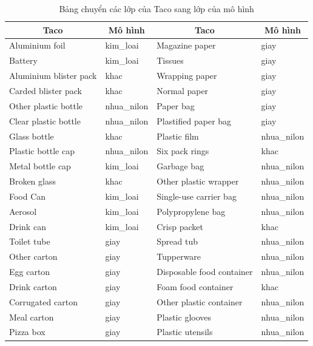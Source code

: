 \documentclass[../the.tex]{subfiles}
\begin{document}
\begin{table}[!ht]
    \centering
    \caption{Bảng chuyển các lớp của Taco sang lớp của mô hình}
    \begin{tabular}{|l|l|l|l|}
		\hline 
		 \multicolumn{1}{|c|}{\textbf{Taco}}
		 & \multicolumn{1}{c|}{\textbf{Mô hình}}
		 & \multicolumn{1}{c|}{\textbf{Taco}}
		 & \multicolumn{1}{c|}{\textbf{Mô hình}}  \\
		\hline
        Aluminium foil & kim\_loai & Magazine paper & giay \\ \hline
        Battery & kim\_loai & Tissues & giay \\ \hline
        Aluminium blister pack & khac & Wrapping paper & giay \\ \hline
        Carded blister pack & khac & Normal paper & giay \\ \hline
        Other plastic bottle & nhua\_nilon & Paper bag & giay \\ \hline
        Clear plastic bottle & nhua\_nilon & Plastified paper bag & giay \\ \hline
        Glass bottle & khac & Plastic film & nhua\_nilon \\ \hline
        Plastic bottle cap & nhua\_nilon & Six pack rings & khac \\ \hline
        Metal bottle cap & kim\_loai & Garbage bag & nhua\_nilon \\ \hline
        Broken glass & khac & Other plastic wrapper & nhua\_nilon \\ \hline
        Food Can & kim\_loai & Single-use carrier bag & nhua\_nilon \\ \hline
        Aerosol & kim\_loai & Polypropylene bag & nhua\_nilon \\ \hline
        Drink can & kim\_loai & Crisp packet & khac \\ \hline
        Toilet tube & giay & Spread tub & nhua\_nilon \\ \hline
        Other carton & giay & Tupperware & nhua\_nilon \\ \hline
        Egg carton & giay & Disposable food container & nhua\_nilon \\ \hline
        Drink carton & giay & Foam food container & khac \\ \hline
        Corrugated carton & giay & Other plastic container & nhua\_nilon \\ \hline
        Meal carton & giay & Plastic glooves & nhua\_nilon \\ \hline
        Pizza box & giay & Plastic utensils & nhua\_nilon \\ \hline

\end{tabular}
\end{table}
\end{document}
